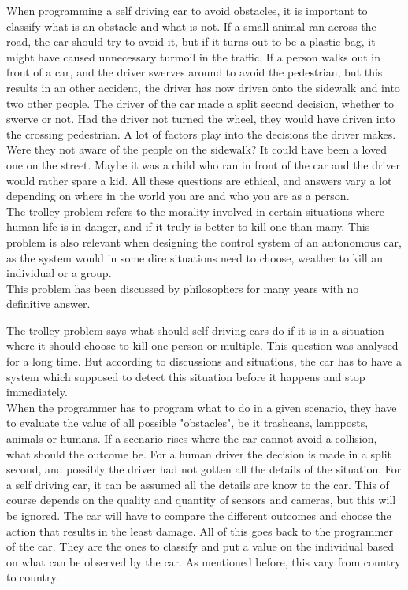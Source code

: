 When programming a self driving car to avoid obstacles, it is important to classify what is an obstacle and what is not. If a small animal ran across the road, the car should try to avoid it, but if it turns out to be a plastic bag, it might have caused unnecessary turmoil in the traffic. If a person walks out in front of a car, and the driver swerves around to avoid the pedestrian, but this results in an other accident, the driver has now driven onto the sidewalk and into two other people. The driver of the car made a split second decision, whether to swerve or not. Had the driver not turned the wheel, they would have driven into the crossing pedestrian. A lot of factors play into the decisions the driver makes. Were they not aware of the people on the sidewalk? It could have been a loved one on the street. Maybe it was a child who ran in front of the car and the driver would rather spare a kid. All these questions are ethical, and answers vary a lot depending on where in the world you are and who you are as a person.\cite{Ethics}\\

\noindent The trolley problem refers to the morality involved in certain situations where human life is in danger, and if it truly is better to kill one than many. This problem is also relevant when designing the control system of an autonomous car, as the system would in some dire situations need to choose, weather to kill an individual or a group. \\
This problem has been discussed by philosophers for many years with no definitive answer. 

\noindent The trolley problem says what should self-driving cars do if it is in a situation where it should choose to kill one person or multiple. This question was analysed for a long time. But according to discussions and situations, the car has to have a system which supposed to detect this situation before it happens and stop immediately. \\

\noindent When the programmer has to program what to do in a given scenario, they have to evaluate the value of all possible "obstacles", be it trashcans, lampposts, animals or humans. If a scenario rises where the car cannot avoid a collision, what should the outcome be. For a human driver the decision is made in a split second, and possibly the driver had not gotten all the details of the situation. For a self driving car, it can be assumed all the details are know to the car. This of course depends on the quality and quantity of sensors and cameras, but this will be ignored. The car will have to compare the different outcomes and choose the action that results in the least damage. All of this goes back to the programmer of the car. They are the ones to classify and put a value on the individual based on what can be observed by the car. As mentioned before, this vary from country to country.\\

